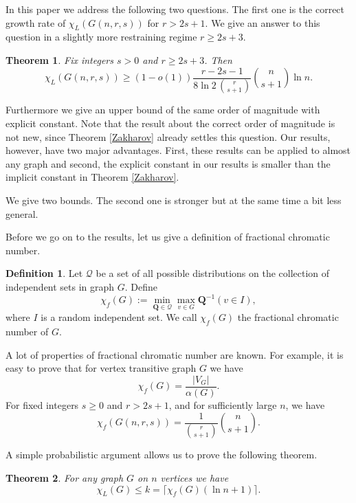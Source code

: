 \documentclass[10pt,a4paper]{article}
\newtheorem{theorem}{Theorem}
\theoremstyle{remark}
\theoremstyle{definition}
\newtheorem{definition}{Definition}[section]
\begin{document}
In this paper we address the following two questions. The first one is the correct growth rate of $\chi_L(G(n,r,s))$ for $r > 2s+1$. We give an answer to this question in a slightly more restraining regime $r \geq 2s+3$. 


\begin{theorem}
    \label{main_gnrs}
    Fix integers $s > 0$ and $r \geq 2s+3$. Then
    $$
        \chi_L(G(n,r,s)) \geq (1-o(1))\frac{r-2s-1}{8\ln 2\, \binom{r}{s+1}}\binom{n}{s+1}\ln n.
    $$
\end{theorem}


Furthermore we give an upper bound of the same order of magnitude with explicit constant. Note that the result about the correct order of magnitude is not new, since Theorem \ref{Zakharov} already settles this question. Our results, however, have two major advantages. First, these results can be applied to almost any graph and second, the explicit constant in our results is smaller than the implicit constant in Theorem \ref{Zakharov}.

We give two bounds. The second one is stronger but at the same time a bit less general.

Before we go on to the results, let us give a definition of fractional chromatic number.

\begin{definition}
    Let $\mathcal{Q}$ be a set of all possible distributions on the collection of independent sets in graph $G$. Define 
    $$
        \chi_f(G) := \min_{\mathbf{Q} \in \mathcal{Q}} \max_{v \in G} \mathbf{Q}^{-1}(v \in I),
    $$
    where $I$ is a random independent set. We call $\chi_f(G)$ the fractional chromatic number of $G$.
\end{definition}

A lot of properties of fractional chromatic number are known. For example, it is easy to prove that for vertex transitive graph $G$ we have
$$
    \chi_f(G) = \frac{|V_G|}{\alpha(G)}.
$$
For fixed integers $s \geq 0$ and $r > 2s+1$, and for sufficiently large $n$, we have 
$$
\chi_f(G(n,r,s)) = \frac{1}{\binom{r}{s+1}}\binom{n}{s+1}.
$$

A simple probabilistic argument allows us to prove the following theorem.

\begin{theorem}
    \label{UB1}
    For any graph $G$ on $n$ vertices we have 
    $$
        \chi_L(G) \leq k = \lceil\chi_f(G)(\ln n + 1)\rceil.
    $$
\end{theorem}
\end{document}
